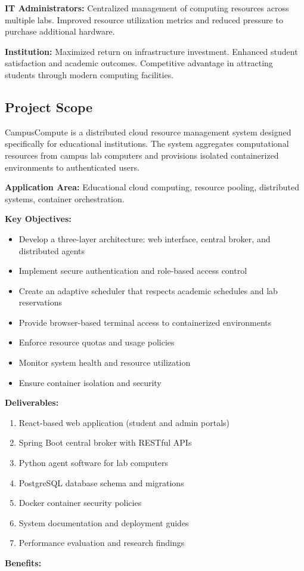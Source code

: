 \documentclass[12pt,a4paper]{article}
\begin{document}
\textbf{IT Administrators:} Centralized management of computing resources across multiple labs. Improved resource utilization metrics and reduced pressure to purchase additional hardware.

\textbf{Institution:} Maximized return on infrastructure investment. Enhanced student satisfaction and academic outcomes. Competitive advantage in attracting students through modern computing facilities.
\subsection{Project Scope}
\label{sec:scope}

CampusCompute is a distributed cloud resource management system designed specifically for educational institutions. The system aggregates computational resources from campus lab computers and provisions isolated containerized environments to authenticated users.

\textbf{Application Area:} Educational cloud computing, resource pooling, distributed systems, container orchestration.

\textbf{Key Objectives:}

\begin{itemize}
    \item Develop a three-layer architecture: web interface, central broker, and distributed agents
    \item Implement secure authentication and role-based access control
    \item Create an adaptive scheduler that respects academic schedules and lab reservations
    \item Provide browser-based terminal access to containerized environments
    \item Enforce resource quotas and usage policies
    \item Monitor system health and resource utilization
    \item Ensure container isolation and security
\end{itemize}

\textbf{Deliverables:}

\begin{enumerate}
    \item React-based web application (student and admin portals)
    \item Spring Boot central broker with RESTful APIs
    \item Python agent software for lab computers
    \item PostgreSQL database schema and migrations
    \item Docker container security policies
    \item System documentation and deployment guides
    \item Performance evaluation and research findings
\end{enumerate}
\textbf{Benefits:}
\end{document}
